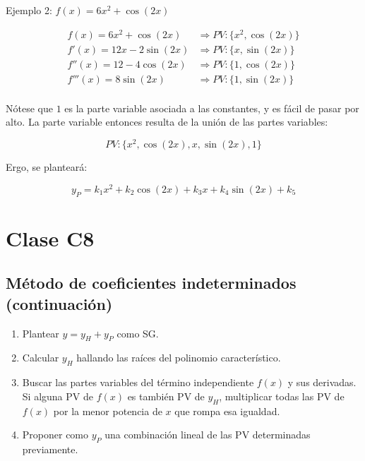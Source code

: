 \documentclass{article}
\begin{document}
Ejemplo 2: $f(x) = 6 x^2 + \cos (2x)$

\begin{equation}
\begin{array}{ll}
f(x) = 6 x^2 + \cos(2 x) &\Rightarrow PV: \{x^2, \cos(2 x)\} \\
f'(x) = 12 x - 2 \sin(2 x) &\Rightarrow PV: \{x, \sin(2 x)\} \\
f''(x) = 12 - 4 \cos(2 x) &\Rightarrow PV: \{1, \cos(2 x)\} \\
f'''(x) = 8 \sin(2 x) &\Rightarrow PV: \{1, \sin(2 x)\} \\
\end{array}
\end{equation}

Nótese que $1$ es la parte variable asociada a las constantes, y es fácil de pasar por alto. La parte variable entonces resulta de la unión de las partes variables:

\begin{equation}
PV: \{x^2, \cos(2 x), x, \sin(2 x), 1\}
\end{equation}

Ergo, se planteará:

\begin{equation}
y_P = k_1 x^2 + k_2 \cos(2x) + k_3 x + k_4 \sin(2 x) + k_5
\end{equation}

\section{Clase C8}

\subsection{Método de coeficientes indeterminados (continuación)}

\begin{enumerate}
\item Plantear $y = y_H + y_P$ como SG.
\item Calcular $y_H$ hallando las raíces del polinomio característico.
\item Buscar las partes variables del término independiente $f(x)$ y sus derivadas. Si alguna PV de $f(x)$ es también PV de $y_H$, multiplicar todas las PV de $f(x)$ por la menor potencia de $x$ que rompa esa igualdad.
\item Proponer como $y_P$ una combinación lineal de las PV determinadas previamente.
\end{enumerate}
\end{document}
